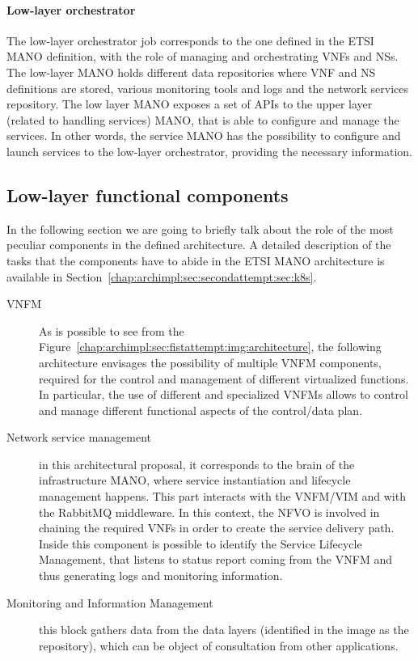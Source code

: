 \paragraph*{Low-layer orchestrator}
The low-layer orchestrator job corresponds to the one defined in the ETSI MANO
definition, with the role of managing and orchestrating VNFs and NSs. The
low-layer MANO holds different data repositories where VNF and NS definitions
are stored, various monitoring tools and logs and the network services
repository. The low layer MANO exposes a set of APIs to the upper layer (related
to handling services) MANO, that is able to configure and manage the services.
In other words, the service MANO has the possibility to configure and launch
services to the low-layer orchestrator, providing the necessary information.

\subsection{Low-layer functional components}
In the following section we are going to briefly talk about the role of the most
peculiar components in the defined architecture. A detailed description of the
tasks that the components have to abide in the ETSI MANO architecture is
available in Section~\ref{chap:archimpl:sec:secondattempt:sec:k8s}.
\begin{description}
\item[VNFM] As is possible to see from the
  Figure~\ref{chap:archimpl:sec:fistattempt:img:architecture}, the following
  architecture envisages the possibility of multiple VNFM components, required
  for the control and management of different virtualized functions. In
  particular, the use of different and specialized VNFMs allows to control and
  manage different functional aspects of the control/data plan.
\item[Network service management] in this architectural proposal, it corresponds
  to the brain of the infrastructure MANO, where service instantiation and
  lifecycle management happens. This part interacts with the VNFM/VIM and with
  the RabbitMQ middleware. In this context, the NFVO is involved in chaining the
  required VNFs in order to create the service delivery path. Inside this
  component is possible to identify the Service Lifecycle Management, that
  listens to status report coming from the VNFM and thus generating logs and
  monitoring information.
\item[Monitoring and Information Management] this block gathers data from the
  data layers (identified in the image as the repository), which can be object
  of consultation from other applications.
\end{description}

